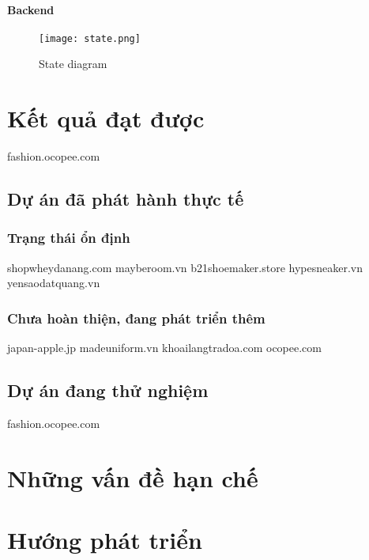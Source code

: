 \paragraph{Backend}
%	
\begin{figure}[h]
	\caption{State diagram \cite{web:mongo:why}}
	\centering
	\texttt{[image: state.png]}
	\label{fig:state}
\end{figure}
%
\section{Kết quả đạt được}

{\Huge fashion.ocopee.com}

\subsection{Dự án đã phát hành thực tế}

\subsubsection{Trạng thái ổn định}

shopwheydanang.com
mayberoom.vn
b21shoemaker.store
hypesneaker.vn
yensaodatquang.vn

\subsubsection{Chưa hoàn thiện, đang phát triển thêm}

japan-apple.jp
madeuniform.vn
khoailangtradoa.com
ocopee.com

\subsection{Dự án đang thử nghiệm}
fashion.ocopee.com

\section{Những vấn đề hạn chế}

\section{Hướng phát triển}
